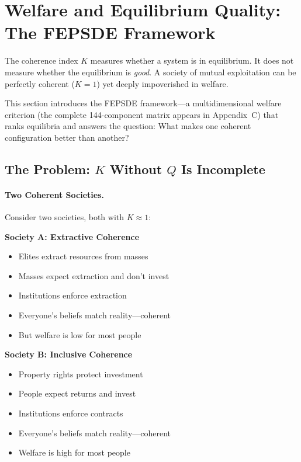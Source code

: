 \documentclass[12pt,a4paper]{article}
\begin{document}
\section{Welfare and Equilibrium Quality: The FEPSDE Framework}
\label{sec:fepsde}

The coherence index $K$ measures whether a system is in equilibrium.
It does not measure whether the equilibrium is \emph{good}.
A society of mutual exploitation can be perfectly coherent ($K = 1$)
yet deeply impoverished in welfare.

This section introduces the FEPSDE framework---a multidimensional welfare criterion (the complete 144-component matrix appears in Appendix~C)
that ranks equilibria and answers the question: What makes one coherent configuration
better than another?

\subsection{The Problem: $K$ Without $Q$ Is Incomplete}

\paragraph{Two Coherent Societies.}
Consider two societies, both with $K \approx 1$:

\textbf{Society A: Extractive Coherence}
\begin{itemize}
  \item Elites extract resources from masses
  \item Masses expect extraction and don't invest
  \item Institutions enforce extraction
  \item Everyone's beliefs match reality---coherent
  \item But welfare is low for most people
\end{itemize}

\textbf{Society B: Inclusive Coherence}
\begin{itemize}
  \item Property rights protect investment
  \item People expect returns and invest
  \item Institutions enforce contracts
  \item Everyone's beliefs match reality---coherent
  \item Welfare is high for most people
\end{itemize}
\end{document}
